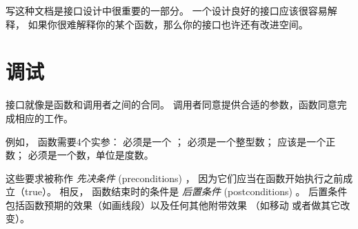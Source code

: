 
写这种文档是接口设计中很重要的一部分。 一个设计良好的接口应该很容易解释，
如果你很难解释你的某个函数，那么你的接口也许还有改进空间。


\section{调试}
  
  


接口就像是函数和调用者之间的合同。
调用者同意提供合适的参数，函数同意完成相应的工作。


例如，  函数需要4个实参：  必须是一个  ；
 必须是一个整型数；  应该是一个正数；
 必须是一个数，单位是度数。


这些要求被称作 \emph{先决条件} (preconditions) ，
因为它们应当在函数开始执行之前成立（true）。  
相反， 函数结束时的条件是 \emph{后置条件} (postconditions) 。  
后置条件包括函数预期的效果（如画线段）以及任何其他附带效果
（如移动  或者做其它改变）。
  
  


